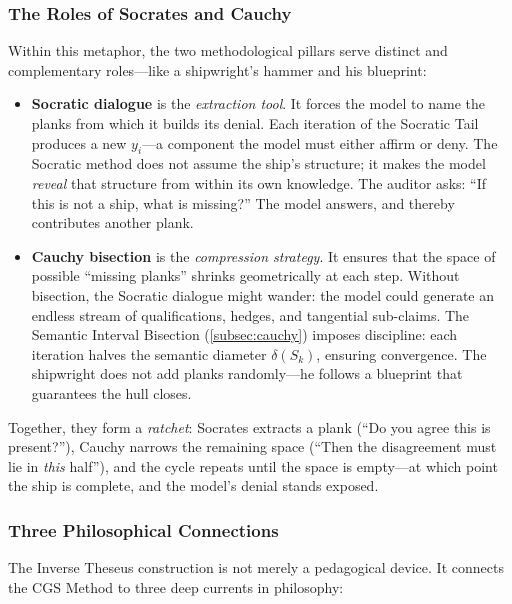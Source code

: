 \documentclass[11pt,a4paper]{article}
\theoremstyle{definition}
\theoremstyle{plain}
\theoremstyle{remark}
\begin{document}
\subsubsection{The Roles of Socrates and Cauchy}

Within this metaphor, the two methodological pillars serve distinct and complementary roles---like a shipwright's hammer and his blueprint:

\begin{itemize}[itemsep=5pt]
  \item \textbf{Socratic dialogue} is the \textit{extraction tool}. It forces the model to name the planks from which it builds its denial. Each iteration of the Socratic Tail produces a new $y_i$---a component the model must either affirm or deny. The Socratic method does not assume the ship's structure; it makes the model \emph{reveal} that structure from within its own knowledge. The auditor asks: ``If this is not a ship, what is missing?'' The model answers, and thereby contributes another plank.

  \item \textbf{Cauchy bisection} is the \textit{compression strategy}. It ensures that the space of possible ``missing planks'' shrinks geometrically at each step. Without bisection, the Socratic dialogue might wander: the model could generate an endless stream of qualifications, hedges, and tangential sub-claims. The Semantic Interval Bisection (\cref{subsec:cauchy}) imposes discipline: each iteration halves the semantic diameter $\delta(S_k)$, ensuring convergence. The shipwright does not add planks randomly---he follows a blueprint that guarantees the hull closes.
\end{itemize}

Together, they form a \emph{ratchet}: Socrates extracts a plank (``Do you agree this is present?''), Cauchy narrows the remaining space (``Then the disagreement must lie in \emph{this} half''), and the cycle repeats until the space is empty---at which point the ship is complete, and the model's denial stands exposed.

\subsubsection{Three Philosophical Connections}

The Inverse Theseus construction is not merely a pedagogical device. It connects the CGS Method to three deep currents in philosophy:
\end{document}
